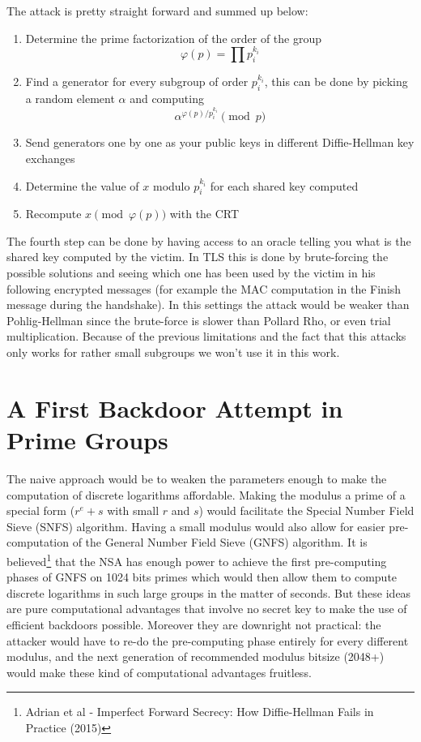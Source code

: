 \documentclass[a4paper,11pt,twocolumn]{article}
\begin{document}
The attack is pretty straight forward and summed up below:

\begin{enumerate}
    \item Determine the prime factorization of the order of the group
      $$\varphi(p) = \prod p_i^{k_i} $$
    \item Find a generator for every subgroup of order $p_i^{k_i}$, this can be done by picking a random element $\alpha$ and computing
      $$\alpha^{\varphi(p) / p_i^{k_i}} \pmod{p}$$
    \item Send generators one by one as your public keys in different Diffie-Hellman key exchanges
    \item Determine the value of $x$ modulo $p_i^{k_i}$ for each shared key computed
    \item Recompute $x \pmod{\varphi(p)}$ with the CRT
\end{enumerate}

The fourth step can be done by having access to an oracle telling you what is the shared key computed by the victim. In TLS this is done by brute-forcing the possible solutions and seeing which one has been used by the victim in his following encrypted messages (for example the MAC computation in the Finish message during the handshake). In this settings the attack would be weaker than Pohlig-Hellman since the brute-force is slower than Pollard Rho, or even trial multiplication. Because of the previous limitations and the fact that this attacks only works for rather small subgroups we won't use it in this work.

\section{A First Backdoor Attempt in Prime Groups}

The naive approach would be to weaken the parameters enough to make the computation of discrete logarithms affordable. Making the modulus a prime of a special form ($r^e + s$ with small $r$ and $s$) would facilitate the Special Number Field Sieve (SNFS) algorithm. Having a small modulus would also allow for easier pre-computation of the General Number Field Sieve (GNFS) algorithm. It is believed\footnote{Adrian et al - Imperfect Forward Secrecy: How Diffie-Hellman Fails in Practice (2015)}\cite{logjam} that the NSA has enough power to achieve the first pre-computing phases of GNFS on 1024 bits primes which would then allow them to compute discrete logarithms in such large groups in the matter of seconds. But these ideas are pure computational advantages that involve no secret key to make the use of efficient backdoors possible. Moreover they are downright not practical: the attacker would have to re-do the pre-computing phase entirely for every different modulus, and the next generation of recommended modulus bitsize (2048+) would make these kind of computational advantages fruitless.\\
\end{document}
